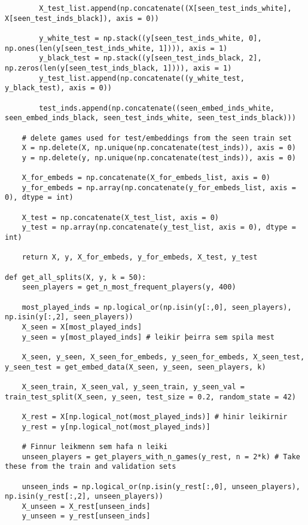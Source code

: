 \begin{verbatim}
        X_test_list.append(np.concatenate((X[seen_test_inds_white], X[seen_test_inds_black]), axis = 0))

        y_white_test = np.stack((y[seen_test_inds_white, 0], np.ones(len(y[seen_test_inds_white, 1]))), axis = 1)
        y_black_test = np.stack((y[seen_test_inds_black, 2], np.zeros(len(y[seen_test_inds_black, 1]))), axis = 1)
        y_test_list.append(np.concatenate((y_white_test, y_black_test), axis = 0))
        
        test_inds.append(np.concatenate((seen_embed_inds_white, seen_embed_inds_black, seen_test_inds_white, seen_test_inds_black)))

    # delete games used for test/embeddings from the seen train set
    X = np.delete(X, np.unique(np.concatenate(test_inds)), axis = 0)
    y = np.delete(y, np.unique(np.concatenate(test_inds)), axis = 0)

    X_for_embeds = np.concatenate(X_for_embeds_list, axis = 0)
    y_for_embeds = np.array(np.concatenate(y_for_embeds_list, axis = 0), dtype = int)

    X_test = np.concatenate(X_test_list, axis = 0)
    y_test = np.array(np.concatenate(y_test_list, axis = 0), dtype = int)

    return X, y, X_for_embeds, y_for_embeds, X_test, y_test

def get_all_splits(X, y, k = 50):
    seen_players = get_n_most_frequent_players(y, 400)

    most_played_inds = np.logical_or(np.isin(y[:,0], seen_players), np.isin(y[:,2], seen_players))
    X_seen = X[most_played_inds]
    y_seen = y[most_played_inds] # leikir þeirra sem spila mest

    X_seen, y_seen, X_seen_for_embeds, y_seen_for_embeds, X_seen_test, y_seen_test = get_embed_data(X_seen, y_seen, seen_players, k)

    X_seen_train, X_seen_val, y_seen_train, y_seen_val = train_test_split(X_seen, y_seen, test_size = 0.2, random_state = 42)

    X_rest = X[np.logical_not(most_played_inds)] # hinir leikirnir
    y_rest = y[np.logical_not(most_played_inds)]

    # Finnur leikmenn sem hafa n leiki
    unseen_players = get_players_with_n_games(y_rest, n = 2*k) # Take these from the train and validation sets

    unseen_inds = np.logical_or(np.isin(y_rest[:,0], unseen_players), np.isin(y_rest[:,2], unseen_players))
    X_unseen = X_rest[unseen_inds]
    y_unseen = y_rest[unseen_inds]


\end{verbatim}

